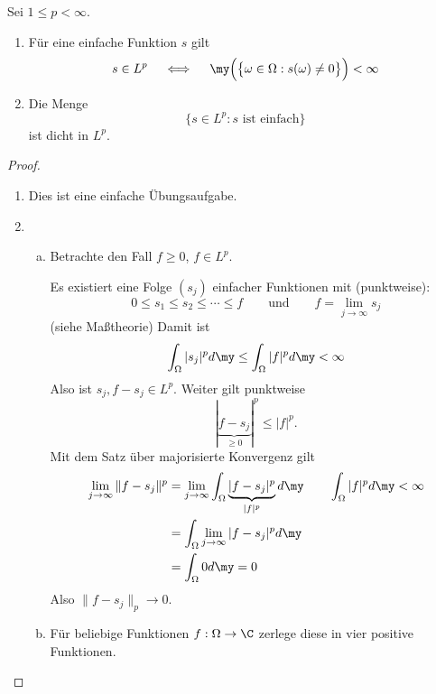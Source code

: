 \documentclass{mycourse}
\begin{document}
\begin{st} \label{2.15}
	Sei $1 \le p < \infty$.
	\begin{enumerate}[1)]
		\item
			Für eine einfache Funktion $s$ gilt
			\[
				s \in L^p
				\quad \iff \quad
				\my\Big( \big\{ \omega \in \Omega : s(\omega) \neq 0 \big\} \Big) < \infty
			\]
		\item
			Die Menge
			\[
				\Big\{ s \in L^p : s \text{ ist einfach} \Big\}
			\]
			ist dicht in $L^p$.
	\end{enumerate}
	\begin{proof}
		\begin{enumerate}[1)]
			\item
				Dies ist eine einfache Übungsaufgabe.
			\item
				\begin{enumerate}[a)]
					\item
						Betrachte den Fall $f \ge 0$, $f \in L^p$.

						Es existiert eine Folge $(s_j)$ einfacher Funktionen mit (punktweise):
						\[
							0 \le s_1 \le s_2 \le \dotsb \le f
							\qquad \text{und} \qquad
							f = \lim_{j\to \infty} s_j
						\]
						(siehe Maßtheorie)
						Damit ist
						\[
							\int_{\Omega} |s_j|^p d\my
							\le \int_{\Omega} |f|^p d\my
							< \infty
						\]
						Also ist $s_j, f-s_j \in L^p$.
						Weiter gilt punktweise
						\[
							|\underbrace{f - s_j}_{\ge 0}|^p \le |f|^p.
						\]
						Mit dem Satz über majorisierte Konvergenz gilt
						\begin{align*}
							\lim_{j\to \infty} \|f - s_j\|^p
							&= \lim_{j\to \infty} \int_{\Omega} \underbrace{|f-s_j|^p}_{|f|^p} d\my  \qquad \int_{\Omega} |f|^p d\my < \infty\\
							&= \int_{\Omega} \lim_{j\to \infty} |f- s_j |^p d\my \\
							&= \int_{\Omega} 0 d\my
							= 0
						\end{align*}
						Also $\|f-s_j\|_p \to 0$.
					\item
						Für beliebige Funktionen $f: \Omega \to \C$ zerlege diese in vier positive Funktionen.
				\end{enumerate}
		\end{enumerate}
	\end{proof}
\end{st}
\end{document}
